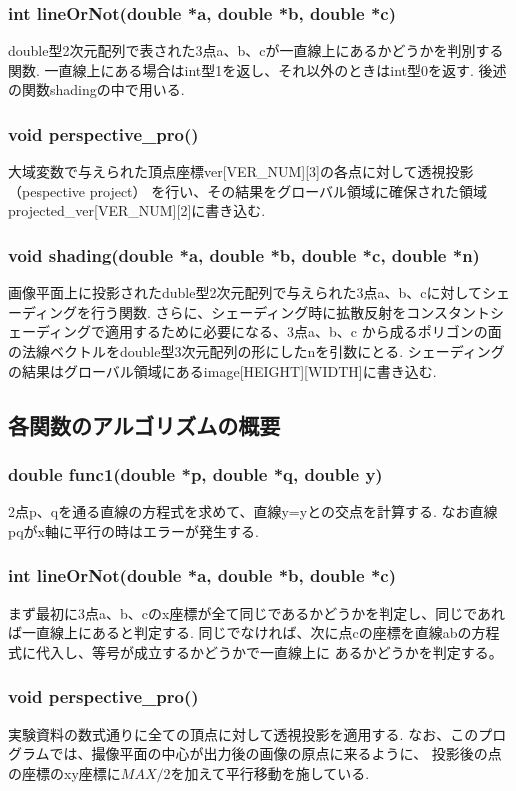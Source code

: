\documentclass[a4j,dvipdfmx]{jsarticle}
\begin{document}
\subsubsection{int lineOrNot(double *a, double *b, double *c)}
double型2次元配列で表された3点a、b、cが一直線上にあるかどうかを判別する関数.
一直線上にある場合はint型1を返し、それ以外のときはint型0を返す.
後述の関数shadingの中で用いる.

\subsubsection{void perspective\_pro()}
大域変数で与えられた頂点座標ver[VER\_NUM][3]の各点に対して透視投影（pespective project）
を行い、その結果をグローバル領域に確保された領域projected\_ver[VER\_NUM][2]に書き込む.

\subsubsection{void shading(double *a, double *b, double *c, double *n)}
画像平面上に投影されたduble型2次元配列で与えられた3点a、b、cに対してシェーディングを行う関数.
さらに、シェーディング時に拡散反射をコンスタントシェーディングで適用するために必要になる、3点a、b、c
から成るポリゴンの面の法線ベクトルをdouble型3次元配列の形にしたnを引数にとる.
シェーディングの結果はグローバル領域にあるimage[HEIGHT][WIDTH]に書き込む.

\subsection{各関数のアルゴリズムの概要}
\subsubsection{double func1(double *p, double *q, double y)}
2点p、qを通る直線の方程式を求めて、直線y=yとの交点を計算する.
なお直線pqがx軸に平行の時はエラーが発生する.

\subsubsection{int lineOrNot(double *a, double *b, double *c)}
まず最初に3点a、b、cのx座標が全て同じであるかどうかを判定し、同じであれば一直線上にあると判定する.
同じでなければ、次に点cの座標を直線abの方程式に代入し、等号が成立するかどうかで一直線上に
あるかどうかを判定する。

\subsubsection{void perspective\_pro()}
実験資料の数式通りに全ての頂点に対して透視投影を適用する.
なお、このプログラムでは、撮像平面の中心が出力後の画像の原点に来るように、
投影後の点の座標のxy座標に$MAX/2$を加えて平行移動を施している.
\end{document}
